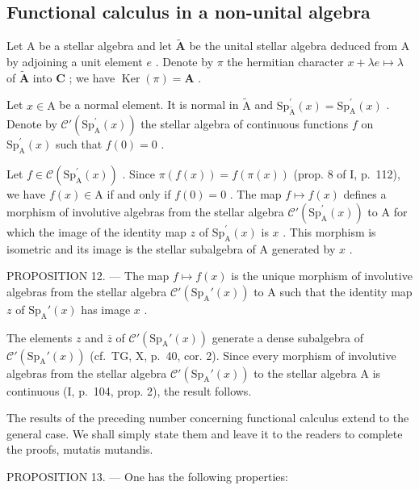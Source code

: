 \subsection{Functional calculus in a non-unital algebra}

Let A be a stellar algebra and let \(\widetilde{\mathbf{A}}\) be the unital stellar algebra deduced from A by adjoining a unit element \(e\) . Denote by \(\pi\) the hermitian character \(x + \lambda e \mapsto \lambda\) of \(\widetilde{\mathbf{A}}\) into \(\mathbf{C}\) ; we have \(\operatorname{Ker}(\pi) = \mathbf{A}\) .

Let \(x \in \mathrm{A}\) be a normal element. It is normal in \(\widetilde{\mathrm{A}}\) and \(\mathrm{Sp}_{\widetilde{\mathrm{A}}}^{\prime}(x) = \mathrm{Sp}_{\mathrm{A}}^{\prime}(x)\) . Denote by \(\mathcal{C}'(\mathrm{Sp}_{\mathrm{A}}^{\prime}(x))\) the stellar algebra of continuous functions \(f\) on \(\mathrm{Sp}_{\mathrm{A}}^{\prime}(x)\) such that \(f(0) = 0\) .

Let \(f \in \mathcal{C}(\mathrm{Sp}_{\mathrm{A}}^{\prime}(x))\) . Since \(\pi(f(x)) = f(\pi(x))\) (prop. 8 of I, p.~112), we have \(f(x) \in \mathrm{A}\) if and only if \(f(0) = 0\) . The map \(f \mapsto f(x)\) defines a morphism of involutive algebras from the stellar algebra \(\mathcal{C}'(\mathrm{Sp}_{\mathrm{A}}^{\prime}(x))\) to A for which the image of the identity map \(z\) of \(\mathrm{Sp}_{\mathrm{A}}^{\prime}(x)\) is \(x\) . This morphism is isometric and its image is the stellar subalgebra of A generated by \(x\) .

PROPOSITION 12. --- The map \(f \mapsto f(x)\) is the unique morphism of involutive algebras from the stellar algebra \(\mathcal{C}'(\mathrm{Sp}_{\mathrm{A}}'(x))\) to A such that the identity map \(z\) of \(\mathrm{Sp}_{\mathrm{A}}'(x)\) has image \(x\) .

The elements \(z\) and \(\overline{z}\) of \(\mathcal{C}'(\mathrm{Sp}_{\mathrm{A}}'(x))\) generate a dense subalgebra of \(\mathcal{C}'(\mathrm{Sp}_{\mathrm{A}}'(x))\) (cf.~TG, X, p.~40, cor. 2). Since every morphism of involutive algebras from the stellar algebra \(\mathcal{C}'(\mathrm{Sp}_{\mathrm{A}}'(x))\) to the stellar algebra A is continuous (I, p.~104, prop. 2), the result follows.

The results of the preceding number concerning functional calculus extend to the general case. We shall simply state them and leave it to the readers to complete the proofs, mutatis mutandis.

PROPOSITION 13. --- One has the following properties:

